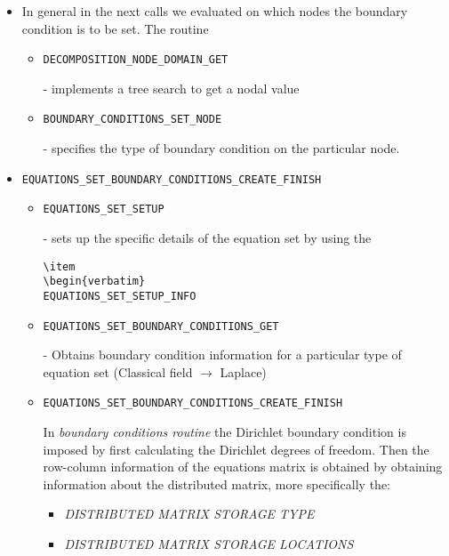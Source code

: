 \begin{itemize}
 \item In general in the next calls we evaluated on which nodes the boundary condition is to be set. The routine 
\begin{itemize}
\item
\begin{verbatim}
DECOMPOSITION_NODE_DOMAIN_GET
\end{verbatim} - implements a tree search to get a nodal value
\item
\begin{verbatim}
BOUNDARY_CONDITIONS_SET_NODE
\end{verbatim} - specifies the type of boundary condition on the particular node.
\end{itemize}
\item
\begin{verbatim}
EQUATIONS_SET_BOUNDARY_CONDITIONS_CREATE_FINISH
\end{verbatim} 
\begin{itemize}
\item
\begin{verbatim}
EQUATIONS_SET_SETUP
\end{verbatim} - sets up the specific details of the equation set by using the  \begin{verbatim}
\item
\begin{verbatim}
EQUATIONS_SET_SETUP_INFO
\end{verbatim}
\item
\begin{verbatim}
EQUATIONS_SET_BOUNDARY_CONDITIONS_GET
\end{verbatim} - Obtains boundary condition information for a particular type of equation set (Classical field $\rightarrow$ Laplace)
\item
\begin{verbatim}
EQUATIONS_SET_BOUNDARY_CONDITIONS_CREATE_FINISH
\end{verbatim} 
In \emph{boundary conditions routine}
the Dirichlet boundary condition is imposed by first calculating the Dirichlet degrees of freedom. 
Then the row-column information of the equations matrix is obtained by obtaining information about the distributed matrix, 
more specifically the:

\begin{itemize}
 \item \emph{DISTRIBUTED MATRIX STORAGE TYPE}  
 \item \emph{DISTRIBUTED MATRIX STORAGE LOCATIONS}
\end{itemize}

\end{itemize}

\end{itemize}
 

